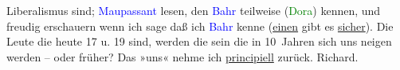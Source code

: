                     Liberalismus sind; \textcolor{blue}{Maupassant}{}\ledrightnote{\textcolor{blue}{Guy de Maupassant}} lesen, den
                        \textcolor{blue}{Bahr}{}\ledrightnote{\textcolor{blue}{Hermann Bahr}} teilweise (\textcolor{green}{Dora}{}\ledrightnote{\textcolor{green}{Dora}}) kennen, und freudig erschauern wenn ich sage daß ich
                        \textcolor{blue}{Bahr}{}\ledrightnote{\textcolor{blue}{Hermann Bahr}} kenne (\uline{einen} gibt es \uline{sicher}). Die Leute die
                    heute 17 u. 19 sind, werden die sein die in 10 Jahren sich uns neigen werden –
                    oder früher? Das »uns« nehme ich \uline{principiell}
                    zurück. \spacefill\mbox{Richard.}\pend
           \endnumbering{}  
      